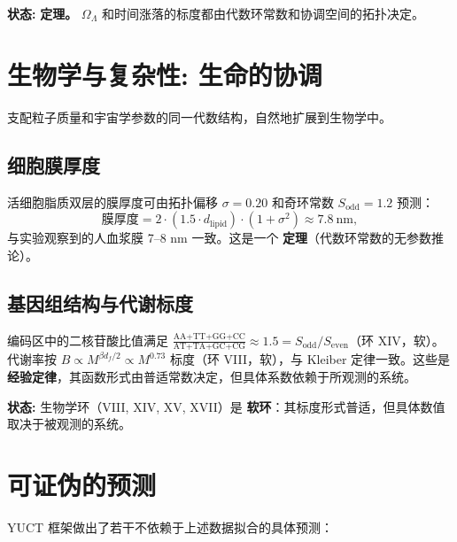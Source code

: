 \documentclass[12pt,a4paper]{article}
\begin{document}
	\textbf{状态:} \textbf{定理。} \(\Omega_\Lambda\) 和时间涨落的标度都由代数环常数和协调空间的拓扑决定。
	
	\section{生物学与复杂性: 生命的协调}
	\label{sec:biology}
	
	支配粒子质量和宇宙学参数的同一代数结构，自然地扩展到生物学中。
	
	\subsection{细胞膜厚度}
	
	活细胞脂质双层的膜厚度可由拓扑偏移 \(\sigma = 0.20\) 和奇环常数 \(S_{\mathrm{odd}} = 1.2\) 预测：
	\[
	\text{膜厚度} = 2 \cdot (1.5 \cdot d_{\mathrm{lipid}}) \cdot (1 + \sigma^2) \approx 7.8\ \mathrm{nm},
	\]
	与实验观察到的人血浆膜 7--8 nm 一致。这是一个 \textbf{定理}（代数环常数的无参数推论）。
	
	\subsection{基因组结构与代谢标度}
	
	编码区中的二核苷酸比值满足 \(\frac{\text{AA+TT+GG+CC}}{\text{AT+TA+GC+CG}} \approx 1.5 = S_{\mathrm{odd}}/S_{\mathrm{even}}\)（环 XIV，软）。代谢率按 \(B \propto M^{\beta d_f/2} \propto M^{0.73}\) 标度（环 VIII，软），与 Kleiber 定律一致。这些是 \textbf{经验定律}，其函数形式由普适常数决定，但具体系数依赖于所观测的系统。
	
	\textbf{状态:} 生物学环（VIII, XIV, XV, XVII）是 \textbf{软环}：其标度形式普适，但具体数值取决于被观测的系统。
	
	\section{可证伪的预测}
	\label{sec:predictions}
	
	YUCT 框架做出了若干不依赖于上述数据拟合的具体预测：
	
\end{document}
